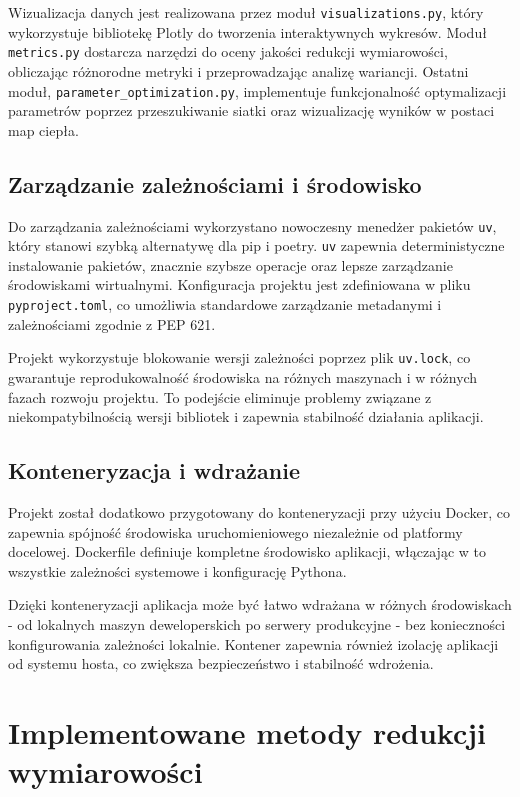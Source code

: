 \documentclass[a4paper, 12pt]{article}
\begin{document}
Wizualizacja danych jest realizowana przez moduł \texttt{visualizations.py}, który wykorzystuje bibliotekę Plotly do tworzenia interaktywnych wykresów. Moduł \texttt{metrics.py} dostarcza narzędzi do oceny jakości redukcji wymiarowości, obliczając różnorodne metryki i przeprowadzając analizę wariancji. Ostatni moduł, \texttt{parameter\_optimization.py}, implementuje funkcjonalność optymalizacji parametrów poprzez przeszukiwanie siatki oraz wizualizację wyników w postaci map ciepła.

\subsection{Zarządzanie zależnościami i środowisko}

Do zarządzania zależnościami wykorzystano nowoczesny menedżer pakietów \texttt{uv}, który stanowi szybką alternatywę dla pip i poetry. \texttt{uv} zapewnia deterministyczne instalowanie pakietów, znacznie szybsze operacje oraz lepsze zarządzanie środowiskami wirtualnymi. Konfiguracja projektu jest zdefiniowana w pliku \texttt{pyproject.toml}, co umożliwia standardowe zarządzanie metadanymi i zależnościami zgodnie z PEP 621.

Projekt wykorzystuje blokowanie wersji zależności poprzez plik \texttt{uv.lock}, co gwarantuje reprodukowalność środowiska na różnych maszynach i w różnych fazach rozwoju projektu. To podejście eliminuje problemy związane z niekompatybilnością wersji bibliotek i zapewnia stabilność działania aplikacji.

\subsection{Konteneryzacja i wdrażanie}

Projekt został dodatkowo przygotowany do konteneryzacji przy użyciu Docker, co zapewnia spójność środowiska uruchomieniowego niezależnie od platformy docelowej. Dockerfile definiuje kompletne środowisko aplikacji, włączając w to wszystkie zależności systemowe i konfigurację Pythona.

Dzięki konteneryzacji aplikacja może być łatwo wdrażana w różnych środowiskach - od lokalnych maszyn deweloperskich po serwery produkcyjne - bez konieczności konfigurowania zależności lokalnie. Kontener zapewnia również izolację aplikacji od systemu hosta, co zwiększa bezpieczeństwo i stabilność wdrożenia.

\section{Implementowane metody redukcji wymiarowości}
\end{document}
